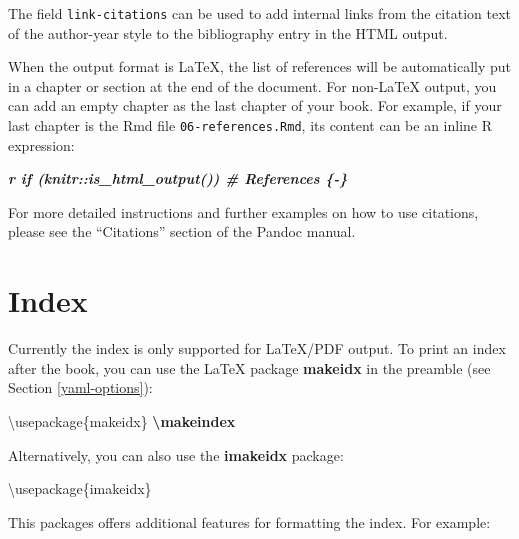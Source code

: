 \documentclass[
  12pt,
]{krantz}
\newenvironment{Shaded}{\begin{snugshade}}{\end{snugshade}}
\newcommand{\BuiltInTok}[1]{#1}
\newcommand{\ExtensionTok}[1]{#1}
\newcommand{\FunctionTok}[1]{\textcolor[rgb]{0.13,0.29,0.53}{\textbf{#1}}}
\newcommand{\InformationTok}[1]{\textcolor[rgb]{0.56,0.35,0.01}{\textbf{\textit{#1}}}}
\newcommand{\NormalTok}[1]{#1}
\theoremstyle{definition}
\theoremstyle{definition}
\theoremstyle{definition}
\theoremstyle{definition}
\theoremstyle{remark}
\begin{document}
The field \texttt{link-citations} can be used to add internal links from the citation text of the author-year style to the bibliography entry in the HTML output.

When the output format is LaTeX, the list of references will be automatically put in a chapter or section at the end of the document. For non-LaTeX output, you can add an empty chapter as the last chapter of your book. For example, if your last chapter is the Rmd file \texttt{06-references.Rmd}, its content can be an inline R expression:

\begin{Shaded}
\begin{Highlighting}[]
\InformationTok{\textasciigrave{}r if (knitr::is\_html\_output()) \textquotesingle{}\# References \{{-}\}\textquotesingle{}\textasciigrave{}}
\end{Highlighting}
\end{Shaded}

For more detailed instructions and further examples on how to use citations, please see the ``Citations'' section of the Pandoc manual.

\section{Index}\label{latex-index}

Currently the index is only supported for LaTeX/PDF output. To print an index after the book, you can use the LaTeX package \textbf{makeidx} in the preamble (see Section \ref{yaml-options}):

\begin{Shaded}
\begin{Highlighting}[]
\BuiltInTok{\textbackslash{}usepackage}\NormalTok{\{}\ExtensionTok{makeidx}\NormalTok{\}}
\FunctionTok{\textbackslash{}makeindex}
\end{Highlighting}
\end{Shaded}

Alternatively, you can also use the \textbf{imakeidx} package:

\begin{Shaded}
\begin{Highlighting}[]
\BuiltInTok{\textbackslash{}usepackage}\NormalTok{\{}\ExtensionTok{imakeidx}\NormalTok{\}}
\end{Highlighting}
\end{Shaded}

This packages offers additional features for formatting the index. For example:
\end{document}
